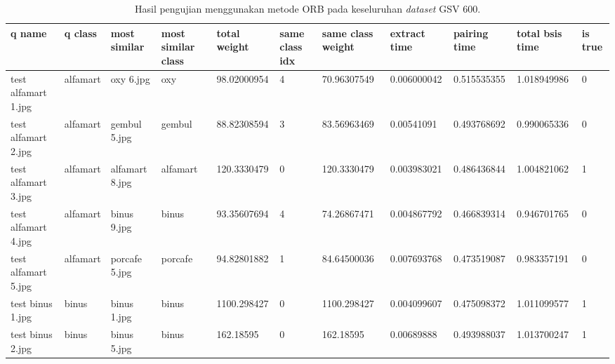 \begin{landscape}
	\begin{longtable}{|p{2cm}|p{1.5cm}|p{2cm}|p{1.5cm}|p{2cm}|p{1cm}|p{2cm}|p{2cm}|p{2cm}|p{2cm}|p{1cm}|}
		\caption{Hasil pengujian menggunakan metode ORB pada keseluruhan \textit{dataset} GSV 600.} \\
		\hline
		\textbf{q name}      & \textbf{q class} & \textbf{most similar} & \textbf{most similar class} & \textbf{total weight} & \textbf{same class idx} & \textbf{same class weight} & \textbf{extract time} & \textbf{pairing time} & \textbf{total bsis time} & \textbf{is true} \\ \hline
		test alfamart 1.jpg  & alfamart         & oxy 6.jpg             & oxy                         & 98.02000954           & 4                       & 70.96307549                & 0.006000042           & 0.515535355           & 1.018949986              & 0                \\ \hline
		test alfamart 2.jpg  & alfamart         & gembul 5.jpg          & gembul                      & 88.82308594           & 3                       & 83.56963469                & 0.00541091            & 0.493768692           & 0.990065336              & 0                \\ \hline
		test alfamart 3.jpg  & alfamart         & alfamart 8.jpg        & alfamart                    & 120.3330479           & 0                       & 120.3330479                & 0.003983021           & 0.486436844           & 1.004821062              & 1                \\ \hline
		test alfamart 4.jpg  & alfamart         & binus 9.jpg           & binus                       & 93.35607694           & 4                       & 74.26867471                & 0.004867792           & 0.466839314           & 0.946701765              & 0                \\ \hline
		test alfamart 5.jpg  & alfamart         & porcafe 5.jpg         & porcafe                     & 94.82801882           & 1                       & 84.64500036                & 0.007693768           & 0.473519087           & 0.983357191              & 0                \\ \hline
		test binus 1.jpg     & binus            & binus 1.jpg           & binus                       & 1100.298427           & 0                       & 1100.298427                & 0.004099607           & 0.475098372           & 1.011099577              & 1                \\ \hline
		test binus 2.jpg     & binus            & binus 5.jpg           & binus                       & 162.18595             & 0                       & 162.18595                  & 0.00689888            & 0.493988037           & 1.013700247              & 1                \\ \hline

\end{longtable}
\end{landscape}

